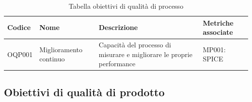 \documentclass[openany,12pt,a4paper]{report}
\begin{document}
    	\begin{longtable}{| p{2cm} | p{3.5cm} |p{5.5cm} | p{5.5cm} |}
    		\caption {Tabella obiettivi di qualità di processo} \label{tab:Tabella obiettivi di qualita di processo} \\
    		\hline
    		\textbf{Codice} & \textbf{Nome} & \textbf{Descrizione} & \textbf{Metriche associate}\\
    		\hline
    		\endhead
    		
    		\newline OQP001&
    		\newline Miglioramento continuo&
    		\newline Capacità del processo di misurare e migliorare le proprie performance \newline &
    		\newline MP001: SPICE
    		\\[1em]
    		
    		\hline
    	\end{longtable}
    \hfill \break
    \hfill \break
    \hfill \break
    \hfill \break
    \hfill \break
    \hfill \break
    \hfill \break
    
    \subsection{Obiettivi di qualità di prodotto}
        
\end{document}
